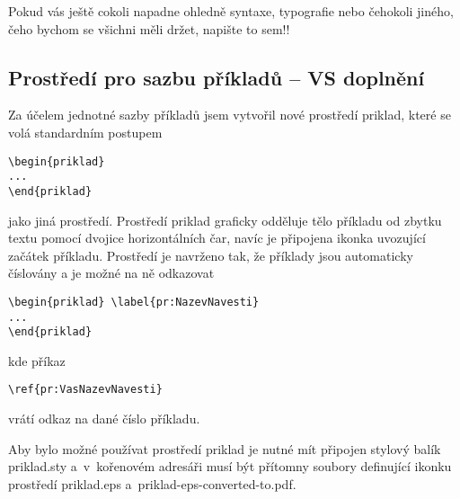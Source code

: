 Pokud vás ještě cokoli napadne ohledně syntaxe, typografie nebo čehokoli jiného, čeho bychom se všichni měli držet, napište to sem!!

\subsection{Prostředí pro sazbu příkladů -- VS doplnění}
Za účelem jednotné sazby příkladů jsem vytvořil nové prostředí \textsf{priklad}, které se volá standardním postupem
\begin{verbatim}
\begin{priklad}
...
\end{priklad}
\end{verbatim}
jako jiná prostředí. Prostředí \textsf{priklad} graficky odděluje tělo příkladu od zbytku textu pomocí dvojice horizontálních čar, navíc je připojena ikonka uvozující začátek příkladu. Prostředí je navrženo tak, že příklady jsou automaticky číslovány a je možné na ně odkazovat
\begin{verbatim}
\begin{priklad} \label{pr:NazevNavesti}
...
\end{priklad}
\end{verbatim}
kde příkaz
\begin{verbatim}
\ref{pr:VasNazevNavesti}
\end{verbatim}
vrátí odkaz na dané číslo příkladu.

Aby bylo možné používat prostředí \textsf{priklad} je nutné mít připojen stylový balík \textsf{priklad.sty} a~v~kořenovém adresáři musí být přítomny soubory definující ikonku prostředí \textsf{priklad.eps} a~\textsf{priklad-eps-converted-to.pdf}.

